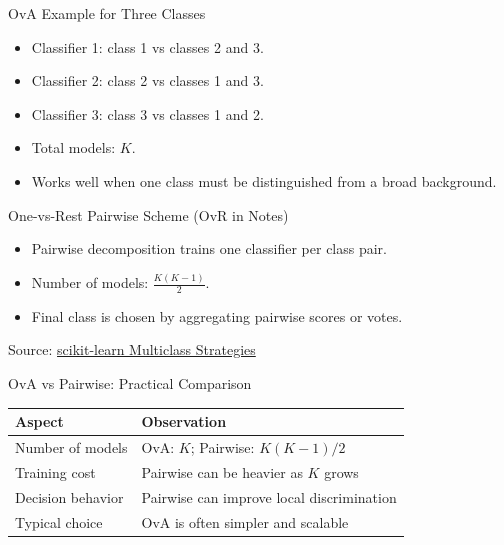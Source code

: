 \documentclass[10pt]{beamer}
\begin{document}
\begin{frame}{OvA Example for Three Classes}
  \justifying
  \begin{itemize}
    \item Classifier 1: class 1 vs classes 2 and 3.
    \item Classifier 2: class 2 vs classes 1 and 3.
    \item Classifier 3: class 3 vs classes 1 and 2.
  \end{itemize}
  \begin{itemize}
    \item Total models: $K$.
    \item Works well when one class must be distinguished from a broad background.
  \end{itemize}
\end{frame}

\begin{frame}{One-vs-Rest Pairwise Scheme (OvR in Notes)}
  \justifying
  \begin{itemize}
    \item Pairwise decomposition trains one classifier per class pair.
    \item Number of models: $\frac{K(K-1)}{2}$.
    \item Final class is chosen by aggregating pairwise scores or votes.
  \end{itemize}
  \vspace{0.3em}
  {\footnotesize Source: \href{https://scikit-learn.org/stable/modules/multiclass.html}{scikit-learn Multiclass Strategies}}
\end{frame}

\begin{frame}{OvA vs Pairwise: Practical Comparison}
  \justifying
  \begin{table}[ht]
    \centering
    \begin{tabular}{p{3cm}p{7cm}}
      \toprule
      Aspect & Observation \\
      \midrule
      Number of models & OvA: $K$; Pairwise: $K(K-1)/2$ \\
      Training cost & Pairwise can be heavier as $K$ grows \\
      Decision behavior & Pairwise can improve local discrimination \\
      Typical choice & OvA is often simpler and scalable \\
      \bottomrule
    \end{tabular}
  \end{table}
\end{frame}
\end{document}
